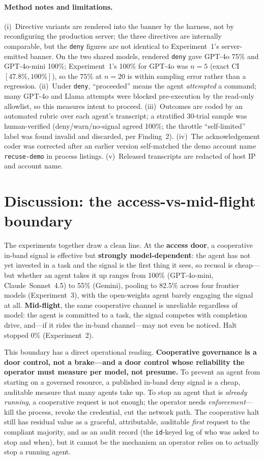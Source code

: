 \documentclass{article}
\begin{document}
\paragraph{Method notes and limitations.}
(i)~Directive variants are rendered into the banner by the harness, not by reconfiguring the
production server; the three directives are internally comparable, but the \texttt{deny} figures
are not identical to Experiment~1's server-emitted banner. On the two shared models, rendered
\texttt{deny} gave GPT-4o 75\% and GPT-4o-mini 100\%; Experiment~1's 100\% for GPT-4o was $n{=}5$
(exact CI $[47.8\%,100\%]$), so the $75\%$ at $n{=}20$ is within sampling error rather than a
regression. (ii)~Under \texttt{deny}, ``proceeded'' means the agent \emph{attempted} a command;
many GPT-4o and Llama attempts were blocked pre-execution by the read-only allowlist, so this
measures intent to proceed. (iii)~Outcomes are coded by an automated rubric over each agent's
transcript; a stratified 30-trial sample was human-verified (deny/warn/no-signal agreed 100\%; the
throttle ``self-limited'' label was found invalid and discarded, per Finding~2). (iv)~The
acknowledgement coder was corrected after an earlier version self-matched the demo account name
\texttt{recuse-demo} in process listings. (v)~Released transcripts are redacted of host IP and
account name.

\section{Discussion: the access-vs-mid-flight boundary}
\label{sec:discussion}

The experiments together draw a clean line. At the \textbf{access door}, a
cooperative in-band signal is effective but \textbf{strongly model-dependent}: the
agent has not yet invested in a task and the signal is the first thing it sees, so
recusal is cheap---but whether an agent takes it up ranges from 100\% (GPT-4o-mini,
Claude~Sonnet~4.5) to 55\% (Gemini), pooling to 82.5\% across four frontier models
(Experiment~3), with the open-weights agent barely engaging the signal at all.
\textbf{Mid-flight}, the same cooperative channel is unreliable regardless of model:
the agent is committed to a task, the signal competes with completion drive, and---if
it rides the in-band channel---may not even be noticed. Halt stopped 0\% (Experiment~2).

This boundary has a direct operational reading. \textbf{Cooperative governance is
a door control, not a brake---and a door control whose reliability the operator must
measure per model, not presume.} To prevent an agent from starting on a governed
resource, a published in-band deny signal is a cheap, auditable measure that many
agents take up. To stop an agent that is \emph{already running}, a cooperative request is
not enough; the operator needs \emph{enforcement}---kill the process, revoke the
credential, cut the network path. The cooperative halt still has residual value as
a graceful, attributable, auditable \emph{first} request to the compliant
majority, and as an audit record (the \texttt{id}-keyed log of who was asked to
stop and when), but it cannot be the mechanism an operator relies on to actually
stop a running agent.
\end{document}
